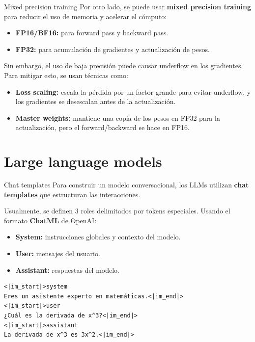 \documentclass{beamer}
\begin{document}
\begin{frame}{Mixed precision training}
    Por otro lado, se puede usar \textbf{mixed precision training} para reducir el uso de memoria y acelerar el cómputo:
    \begin{itemize}
        \item \textbf{FP16/BF16:} para forward pass y backward pass.
        \item \textbf{FP32:} para acumulación de gradientes y actualización de pesos.
    \end{itemize}
    Sin embargo, el uso de baja precisión puede causar underflow en los gradientes. Para mitigar esto, se usan técnicas como:
    \begin{itemize}
        \item \textbf{Loss scaling:} escala la pérdida por un factor grande para evitar underflow, y los gradientes se desescalan antes de la actualización.
        \item \textbf{Master weights:} mantiene una copia de los pesos en FP32 para la actualización, pero el forward/backward se hace en FP16.
    \end{itemize}
\end{frame}

\section{Large language models}

\begin{frame}[fragile]{Chat templates}
    Para construir un modelo conversacional, los LLMs utilizan \textbf{chat templates} que estructuran las interacciones.

    Usualmente, se definen 3 roles delimitados por tokens especiales. Usando el formato \textbf{ChatML} de OpenAI:
    \begin{itemize}
        \item \textbf{System:} instrucciones globales y contexto del modelo.
        \item \textbf{User:} mensajes del usuario.
        \item \textbf{Assistant:} respuestas del modelo.
    \end{itemize}
    \small
    \begin{verbatim}
<|im_start|>system
Eres un asistente experto en matemáticas.<|im_end|>
<|im_start|>user
¿Cuál es la derivada de x^3?<|im_end|>
<|im_start|>assistant
La derivada de x^3 es 3x^2.<|im_end|>
    \end{verbatim}
\end{frame}
\end{document}
